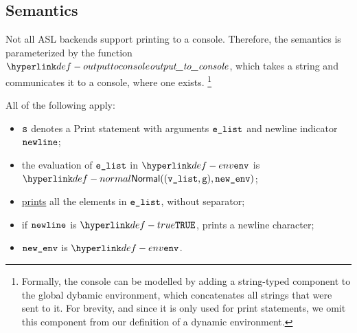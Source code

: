 \FormallyParagraph
\begin{mathpar}
\end{mathpar}

\subsection{Semantics}

Not all ASL backends support printing to a console.
%
Therefore, the semantics is parameterized by the function $\outputtoconsole$,
which takes a string and communicates it to a console, where one exists.%
\footnote{%
  Formally, the console can be modelled by adding a string-typed component to
  the global dybamic environment, which concatenates all strings that were sent
  to it. For brevity, and since it is only used for print statements, we omit
  this component from our definition of a dynamic environment.%
}

\ProseParagraph
All of the following apply:
\begin{itemize}
  \item $\vs$ denotes a Print statement with arguments $\elist$ and newline indicator $\vnewline$;
  \item the evaluation of $\elist$ in $\env$ is $\Normal((\vlist, \vg), \newenv)$\ProseOrAbnormal;
  \item \hyperlink{def-outputtoconsole}{prints} all the elements in $\elist$, without separator;
  \item if $\vnewline$ is $\True$, prints a newline character;
  \item $\newenv$ is $\env$.
\end{itemize}

\FormallyParagraph


